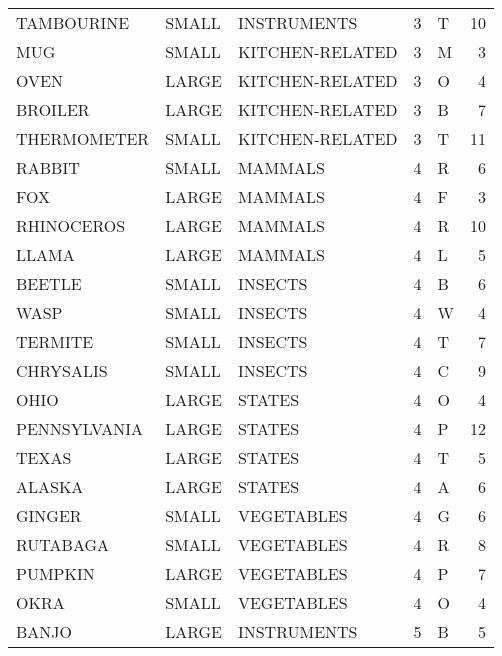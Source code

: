 \begin{tabular}{lllrlr}
  TAMBOURINE & SMALL &      INSTRUMENTS &        3 &            T &      10 \\
         MUG & SMALL &  KITCHEN-RELATED &        3 &            M &       3 \\
        OVEN & LARGE &  KITCHEN-RELATED &        3 &            O &       4 \\
     BROILER & LARGE &  KITCHEN-RELATED &        3 &            B &       7 \\
 THERMOMETER & SMALL &  KITCHEN-RELATED &        3 &            T &      11 \\
      RABBIT & SMALL &          MAMMALS &        4 &            R &       6 \\
         FOX & LARGE &          MAMMALS &        4 &            F &       3 \\
  RHINOCEROS & LARGE &          MAMMALS &        4 &            R &      10 \\
       LLAMA & LARGE &          MAMMALS &        4 &            L &       5 \\
      BEETLE & SMALL &          INSECTS &        4 &            B &       6 \\
        WASP & SMALL &          INSECTS &        4 &            W &       4 \\
     TERMITE & SMALL &          INSECTS &        4 &            T &       7 \\
   CHRYSALIS & SMALL &          INSECTS &        4 &            C &       9 \\
        OHIO & LARGE &           STATES &        4 &            O &       4 \\
PENNSYLVANIA & LARGE &           STATES &        4 &            P &      12 \\
       TEXAS & LARGE &           STATES &        4 &            T &       5 \\
      ALASKA & LARGE &           STATES &        4 &            A &       6 \\
      GINGER & SMALL &       VEGETABLES &        4 &            G &       6 \\
    RUTABAGA & SMALL &       VEGETABLES &        4 &            R &       8 \\
     PUMPKIN & LARGE &       VEGETABLES &        4 &            P &       7 \\
        OKRA & SMALL &       VEGETABLES &        4 &            O &       4 \\
       BANJO & LARGE &      INSTRUMENTS &        5 &            B &       5 \\

\end{tabular}
